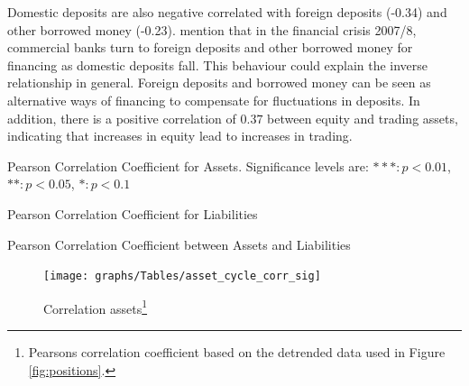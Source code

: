 \documentclass[12pt, a4paper]{article} %
\begin{document}
Domestic deposits are also negative correlated with foreign deposits (-0.34) and other borrowed money (-0.23). \citet{bassett2008profits} mention that in the financial crisis 2007/8, commercial banks turn to foreign deposits and other borrowed money for financing as domestic deposits fall. This behaviour could explain the inverse relationship in general. Foreign deposits and borrowed money can be seen as alternative ways of financing to compensate for fluctuations in deposits.
In addition, there is a positive correlation of $0.37$ between equity and trading assets, indicating that increases in equity lead to increases in trading.\\



\begin{table}[H]
\begin{minipage}{\textwidth}
\scriptsize

\caption[1]{Pearson Correlation Coefficient for Assets. Significance levels are: $*** : p<0.01$, $** : p<0.05$, $* : p<0.1$ }
\label{tab:corr_assets}
\end{minipage}
\end{table}

\begin{table}[H]
\begin{minipage}{\textwidth}
\scriptsize
\hskip-2.0cm

\caption[1]{Pearson Correlation Coefficient for Liabilities}
\label{tab:corr_liab}
\end{minipage}
\end{table}


\begin{table}[H]
\begin{minipage}{\textwidth}
\scriptsize
\hskip-2.0cm

\caption[1]{Pearson Correlation Coefficient between Assets and Liabilities}
\label{tab:corr_comb}
\end{minipage}
\end{table}

\iffalse
\begin{figure}[H]
\begin{minipage}{\textwidth}
\centering
\caption[1]{Correlation assets\footnote{Pearsons correlation coefficient based on the detrended data used in Figure \ref{fig:positions}.} }
\texttt{[image: graphs/Tables/asset\_cycle\_corr\_sig]}
\label{fig:corr_assets}
\end{minipage}
\end{figure}
\hskip-2.0cm
\end{document}
